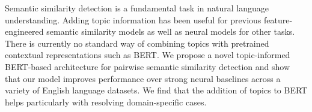 Semantic similarity detection is a fundamental task in natural language understanding. Adding topic information has been useful for previous feature-engineered semantic similarity models as well as neural models for other tasks. There is currently no standard way of combining topics with pretrained contextual representations such as BERT. We propose a novel topic-informed BERT-based architecture for pairwise semantic similarity detection and show that our model improves performance over strong neural baselines across a variety of English language datasets. We find that the addition of topics to BERT helps particularly with resolving domain-specific cases.
